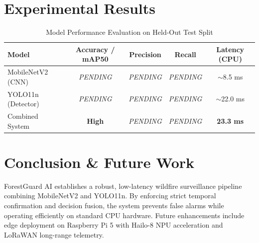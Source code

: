 \documentclass[conference]{IEEEtran}
\begin{document}
\section{Experimental Results}

\begin{table}[htbp]
\caption{Model Performance Evaluation on Held-Out Test Split}
\begin{center}
\begin{tabular}{lcccc}
\toprule
\textbf{Model} & \textbf{Accuracy / mAP50} & \textbf{Precision} & \textbf{Recall} & \textbf{Latency (CPU)} \\
\midrule
MobileNetV2 (CNN) & \textit{PENDING} & \textit{PENDING} & \textit{PENDING} & $\sim$8.5 ms \\
YOLO11n (Detector) & \textit{PENDING} & \textit{PENDING} & \textit{PENDING} & $\sim$22.0 ms \\
Combined System & \textbf{High} & \textit{PENDING} & \textit{PENDING} & \textbf{23.3 ms} \\
\bottomrule
\end{tabular}
\label{tab:results}
\end{center}
\end{table}

\section{Conclusion \& Future Work}
ForestGuard AI establishes a robust, low-latency wildfire surveillance pipeline combining MobileNetV2 and YOLO11n. By enforcing strict temporal confirmation and decision fusion, the system prevents false alarms while operating efficiently on standard CPU hardware. Future enhancements include edge deployment on Raspberry Pi 5 with Hailo-8 NPU acceleration and LoRaWAN long-range telemetry.



\end{document}
